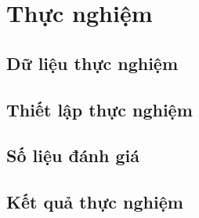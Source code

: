 \chapter{Thực nghiệm}
\label{chap:experiment}

\section{Dữ liệu thực nghiệm}
\label{sec:experiment_data}

\section{Thiết lập thực nghiệm}
\label{sec:experimental_setup}

\section{Số liệu đánh giá}
\label{sec:evaluation_metrics}

\section{Kết quả thực nghiệm}
\label{sec:experiment_results}
